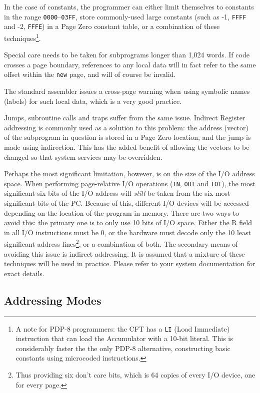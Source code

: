 \documentclass[11pt,a4paper,twocolumns]{article}
\newcommand\register[1]{\textsf{#1}}
\newcommand\PC{\register{PC}}
\begin{document}
In the case of constants, the programmer can either limit themselves
to constants in the range {\tt 0000}–{\tt 03FF}, store commonly-used
large constants (such as -1, {\tt FFFF} and -2, {\tt FFFE}) in a Page
Zero constant table, or a combination of these techniques\footnote{A
  note for PDP-8 programmers: the CFT has a {\tt LI} (Load Immediate)
  instruction that can load the Accumulator with a 10-bit
  literal. This is considerably faster the the only PDP-8 alternative,
  constructing basic constants using microcoded instructions.}.

Special care needs to be taken for subprograms longer than 1,024
words. If code crosses a page boundary, references to any local data
will in fact refer to the same offset within the {\tt new\/} page, and
will of course be invalid.

The standard assembler issues a cross-page warning when using symbolic
names (labels) for such local data, which is a very good practice.

Jumps, subroutine calls and traps suffer from the same issue. Indirect
Register addressing is commonly used as a solution to this problem:
the address (vector) of the subprogram in question is stored in a Page
Zero location, and the jump is made using indirection. This has the
added benefit of allowing the vectors to be changed so that system
services may be overridden.

Perhaps the most significant limitation, however, is on the size of
the I/O address space. When performing page-relative I/O operations
({\tt IN}, {\tt OUT} and {\tt IOT}), the most significant six bits of
the I/O address will {\em still\/} be taken from the six most
significant bits of the \PC. Because of this, different I/O devices
will be accessed depending on the location of the program in
memory. There are two ways to avoid this: the primary one is to only
use 10 bits of I/O space. Either the R field in all I/O instructions
must be 0, or the hardware must decode only the 10 least significant
address lines\footnote{Thus providing six don't care bits, which is 64
  copies of every I/O device, one for every page.}, or a combination
of both. The secondary means of avoiding this issue is indirect
addressing. It is assumed that a mixture of these techniques will be
used in practice. Please refer to your system documentation for exact
details.

\subsection{Addressing Modes}
\end{document}
